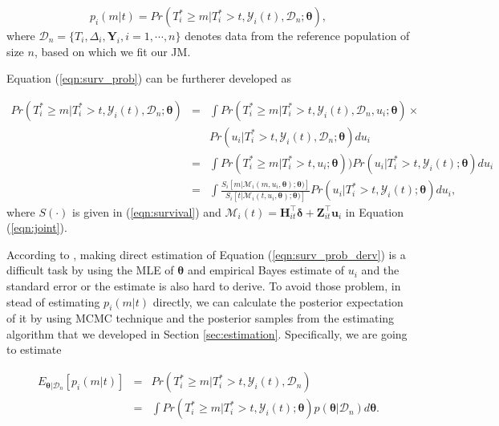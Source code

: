 \begin{equation}\label{eqn:surv_prob}
p_i(m|t) = Pr(T_i^*\ge m|T_i^*>t, \mathcal{Y}_i(t), \mathcal{D}_n;\boldsymbol{\theta}),
\end{equation}
where $\mathcal{D}_n=\{T_i, \Delta_i, \boldsymbol{Y}_i, i=1, \cdots, n\}$ denotes data from the reference population of size $n$, based on which we fit our JM.

Equation (\ref{eqn:surv_prob}) can be furtherer developed as

\begin{eqnarray}\label{eqn:surv_prob_derv}
\nonumber Pr(T_i^*\ge m|T_i^*>t, \mathcal{Y}_i(t), \mathcal{D}_n;\boldsymbol{\theta})&=&\int Pr(T_i^*\ge m|T_i^*>t, \mathcal{Y}_i(t), \mathcal{D}_n, u_i;\boldsymbol{\theta})\times\\\nonumber && Pr(u_i|T_i^*>t, \mathcal{Y}_i(t), \mathcal{D}_n;\boldsymbol{\theta})du_i\\
\nonumber&=&\int Pr(T_i^*\ge m|T_i^*>t, u_i;\boldsymbol{\theta}))Pr(u_i|T_i^*>t, \mathcal{Y}_i(t);\boldsymbol{\theta})du_i\\
&=&\int\frac{{S}_i[m|\mathcal{M}_i(m, u_i, \boldsymbol{\theta});\boldsymbol{\theta})]}{{S}_i[t|\mathcal{M}_i(t, u_i, \boldsymbol{\theta});\boldsymbol{\theta})]}Pr(u_i|T_i^*>t, \mathcal{Y}_i(t);\boldsymbol{\theta})du_i,
\end{eqnarray}
where ${S}(\cdot)$ is given in (\ref{eqn:survival}) and $\mathcal{M}_i(t)={\boldsymbol H}_{it}^{\top}\boldsymbol{\delta} + {\boldsymbol Z}_{it}^{\top}{\boldsymbol u}_i$ in Equation (\ref{eqn:joint}). 



According to \cite{rizopoulos2011dynamic}, making direct estimation of Equation (\ref{eqn:surv_prob_derv}) is a difficult task by using the MLE of $\boldsymbol{\theta}$ and empirical Bayes estimate of $u_i$ and the standard error or the estimate is also hard to derive. To avoid those problem, in stead of estimating $p_i(m|t)$ directly, we can calculate the posterior expectation of it by using MCMC technique and the posterior samples from the estimating algorithm that we developed in Section \ref{sec:estimation}. Specifically, we are going to estimate

\begin{eqnarray}\label{eqn:expct_pred}
\nonumber E_{\boldsymbol{\theta}|\mathcal{D}_n}[p_i(m|t)]&=&Pr(T_i^*\ge m|T_i^*>t, \mathcal{Y}_i(t), \mathcal{D}_n)\\
&=&\int Pr(T_i^*\ge m|T_i^*>t, \mathcal{Y}_i(t);\boldsymbol{\theta})p(\boldsymbol{\theta}|\mathcal{D}_n)d\boldsymbol{\theta}.
\end{eqnarray}

